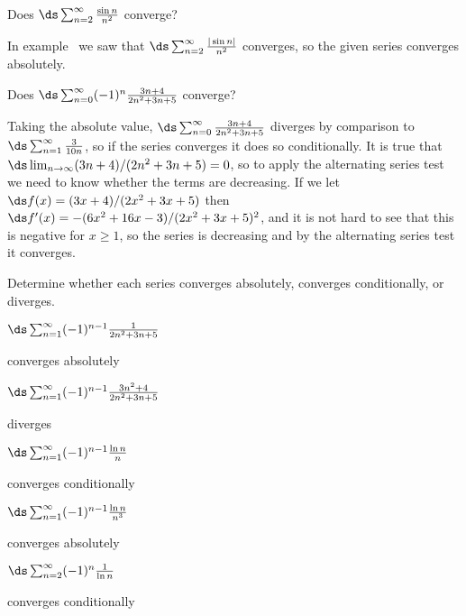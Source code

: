 \begin{theorem}
\begin{example} Does $\ds\sum_{n=2}^\infty {\sin n\over n^2}$ converge?

\ssk\noindent
In example~ we saw that 
$\ds\sum_{n=2}^\infty {|\sin n|\over n^2}$ converges, so the given
series converges absolutely.
\end{example}

\begin{example} Does $\ds\sum_{n=0}^\infty (-1)^{n}{3n+4\over 2n^2+3n+5}$ converge?

\ssk\noindent
Taking the absolute value, $\ds\sum_{n=0}^\infty {3n+4\over 2n^2+3n+5}$
diverges by comparison to $\ds\sum_{n=1}^\infty {3\over 10n}$, so if
the series converges it does so conditionally. It is true that
$\ds\lim_{n\to\infty}(3n+4)/(2n^2+3n+5)=0$, so to apply the
alternating series test we need to know whether the terms are
decreasing.
If we let $\ds f(x)=(3x+4)/(2x^2+3x+5)$ then 
$\ds f'(x)=-(6x^2+16x-3)/(2x^2+3x+5)^2$, and it is not hard to see that
this is negative for $x\ge1$, so the series is decreasing and by the
alternating series test it converges.
\end{example}

\begin{exercises}

Determine whether each series converges absolutely, converges
conditionally, or diverges.

\twocol

\exercise $\ds\sum_{n=1}^\infty (-1)^{n-1}{1\over 2n^2+3n+5}$
\begin{answer} converges absolutely
\end{answer}

\exercise $\ds\sum_{n=1}^\infty (-1)^{n-1}{3n^2+4\over 2n^2+3n+5}$
\begin{answer} diverges
\end{answer}

\exercise $\ds\sum_{n=1}^\infty (-1)^{n-1}{\ln n\over n}$
\begin{answer} converges conditionally
\end{answer}

\exercise $\ds\sum_{n=1}^\infty (-1)^{n-1} {\ln n\over n^3}$
\begin{answer} converges absolutely
\end{answer}

\exercise $\ds\sum_{n=2}^\infty (-1)^n{1\over \ln n}$
\begin{answer} converges conditionally
\end{answer}


\end{exercises}
\end{theorem}
